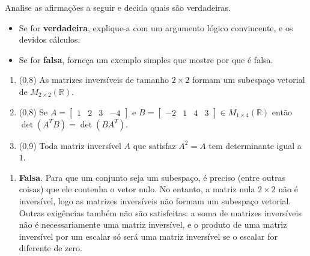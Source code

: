 \documentclass[12pt,a4paper]{article}
\newcommand*\R{\mathbb{R}}
\begin{document}
\begin{ExerciseList}
\Exercise[title={2,5}]
Analise as afirmações a seguir e decida quais são verdadeiras.
\begin{itemize}
\item Se for \textbf{verdadeira}, explique-a com um argumento lógico convincente, e os devidos cálculos.
\item Se for \textbf{falsa}, forneça um exemplo simples que mostre por que é falsa.
\end{itemize}
\begin{enumerate}
\item (0,8) As matrizes inversíveis de tamanho $2 \times 2$ formam um subespaço vetorial de $M_{2 \times 2}(\R)$.
\item (0,8) Se $A = \begin{bmatrix}
1 & 2 & 3 & -4
\end{bmatrix}$ e $B = \begin{bmatrix}
-2 & 1 & 4 & 3
\end{bmatrix} \in M_{1 \times 4} (\R)$ então $\det(A^T B) = \det(B A^T)$.
\item (0,9) Toda matriz inversível $A$ que satisfaz $A^2 = A$ tem determinante igual a $1$.
\end{enumerate}
\Answer
\begin{enumerate}
\item \textbf{Falsa}. Para que um conjunto seja um subespaço, é preciso (entre outras coisas) que ele contenha o vetor nulo. No entanto, a matriz nula $2 \times 2$ não é inversível, logo as matrizes inversíveis não formam um subespaço vetorial. Outras exigências também não são satisfeitas: a soma de matrizes inversíveis não é necessariamente uma matriz inversível, e o produto de uma matriz inversível por um escalar só será uma matriz inversível se o escalar for diferente de zero.


\end{enumerate}
\end{ExerciseList}
\end{document}
